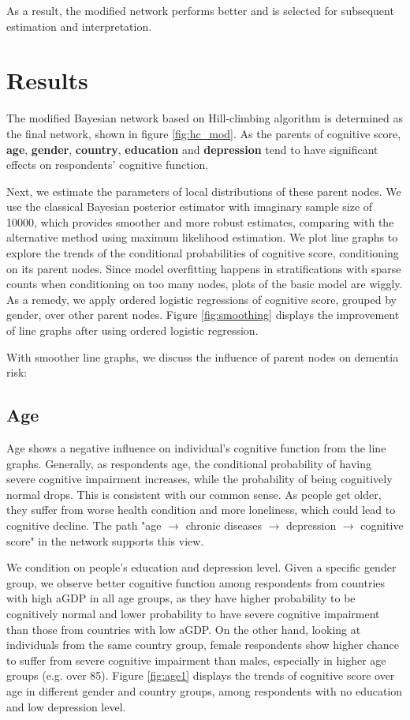 \documentclass[11pt,twoside]{article}
\numberwithin{Theorem}{section}
\numberwithin{Definition}{section}
\numberwithin{Lemma}{section}
\numberwithin{Algorithm}{section}
\numberwithin{equation}{section}
\begin{document}
As a result, the modified network performs better and is selected for subsequent estimation and interpretation.

\clearpage

\section{Results}
\label{sec:results}

The modified Bayesian network based on Hill-climbing algorithm is determined as the final network, shown in figure \ref{fig:hc_mod}.  As the parents of cognitive score, \textbf{age}, \textbf{gender}, \textbf{country}, \textbf{education} and \textbf{depression} tend to have significant effects on respondents' cognitive function. 

Next, we estimate the parameters of local distributions of these parent nodes. We use the classical Bayesian posterior estimator with imaginary sample size of 10000, which provides smoother and more robust estimates, comparing with the alternative method using maximum likelihood estimation. We plot line graphs to explore the trends of the conditional probabilities of cognitive score, conditioning on its parent nodes. Since model overfitting happens in stratifications with sparse counts when conditioning on too many nodes, plots of the basic model are wiggly. As a remedy, we apply ordered logistic regressions of cognitive score, grouped by gender, over other parent nodes. Figure \ref{fig:smoothing} displays the improvement of line graphs after using ordered logistic regression.


With smoother line graphs, we discuss the influence of parent nodes on dementia risk:

\subsection{Age}

Age shows a negative influence on individual's cognitive function from the line graphs. Generally, as respondents age, the conditional probability of having severe cognitive impairment increases, while the probability of being cognitively normal drops. This is consistent with our common sense. As people get older, they suffer from worse health condition and more loneliness, which could lead to cognitive decline. The path "age $\rightarrow$ chronic diseases $\rightarrow$ depression $\rightarrow$ cognitive score" in the network supports this view. 

We condition on people's education and depression level. Given a specific gender group, we observe better cognitive function among respondents from countries with high aGDP in all age groups, as they have higher probability to be cognitively normal and lower probability to have severe cognitive impairment than those from countries with low aGDP. On the other hand, looking at individuals from the same country group, female respondents show higher chance to suffer from severe cognitive impairment than males, especially in higher age groups (e.g. over 85). Figure \ref{fig:age1} displays the trends of cognitive score over age in different gender and country groups, among respondents with no education and low depression level.
\end{document}
